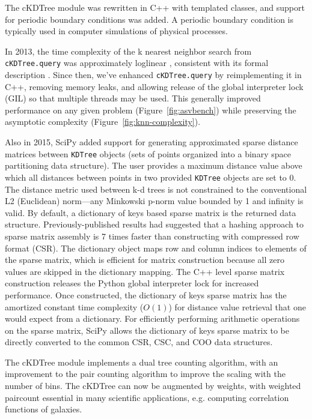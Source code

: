 The cKDTree module was rewritten in C++ with templated classes, and support for
periodic boundary conditions was added. A periodic boundary condition is typically 
used in computer simulations of physical processes.

In 2013, the time complexity of the k nearest neighbor search from
\texttt{cKDTree.query} was approximately loglinear \cite{knn-jake},
consistent with its formal description \cite{kdtree-search-algo}.
Since then, we've enhanced \texttt{cKDTree.query} by reimplementing it in
C++, removing memory leaks, and allowing release of the global interpreter lock (GIL) so that
multiple threads may be used\cite{gh-4374}. This generally improved
performance on any given problem (Figure~\ref{fig:asvbench}) while
preserving the asymptotic complexity (Figure~\ref{fig:knn-complexity}).

Also in 2015, SciPy added support for generating approximated sparse distance matrices 
between \texttt{KDTree} objects (sets of points organized into a binary space 
partitioning data structure\cite{Bentley:1975:MBS:361002.361007}). 
The user provides a maximum distance value
above which all distances between points in two provided \texttt{KDTree} objects
are set to 0. The distance metric used between k-d trees is not constrained
to the conventional L2 (Euclidean) norm---any Minkowski p-norm value
bounded by 1 and infinity is valid. By default, a dictionary of keys
based sparse matrix is the returned data structure. Previously-published
results had suggested that a hashing approach to sparse matrix assembly
is 7 times faster than constructing with compressed row format (CSR)\cite{10.1007/978-3-540-75755-9_107}.
The dictionary object maps row and column indices to elements of the sparse matrix, which is
efficient for matrix construction because all zero values are skipped in
the dictionary mapping. The C++ level sparse matrix construction releases the Python
global interpreter lock for increased performance. Once constructed, the
dictionary of keys sparse matrix has the amortized constant time complexity 
($O(1)$) for distance value retrieval that one would expect from a 
dictionary\cite{Cormen:2001:IA:580470}. For efficiently performing arithmetic
operations on the sparse matrix, SciPy allows the dictionary of keys
sparse matrix to be directly converted to the common CSR, CSC, and COO
data structures.

The cKDTree module implements a dual tree counting algorithm\cite{Moore2000ar},
with an improvement to the pair counting algorithm to improve the scaling
with the number of bins. The cKDTree can now be augmented by weights, with 
weighted paircount essential in many scientific applications, e.g. computing 
correlation functions of galaxies\cite{0004-637X-750-1-38}.
